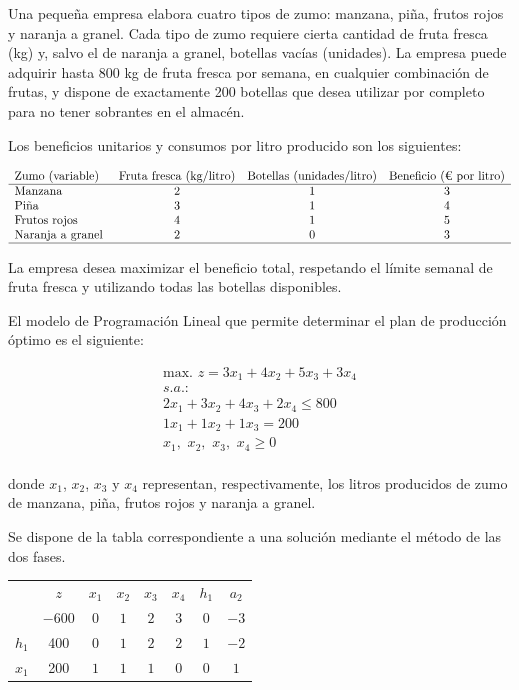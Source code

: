 Una pequeña empresa elabora cuatro tipos de zumo: manzana, piña, frutos rojos y naranja a granel.  
Cada tipo de zumo requiere cierta cantidad de fruta fresca (kg) y, salvo el de naranja a granel, botellas vacías (unidades).  
La empresa puede adquirir hasta 800 kg de fruta fresca por semana, en cualquier combinación de frutas, y dispone de exactamente 200 botellas que desea utilizar por completo para no tener sobrantes en el almacén.  

Los beneficios unitarios y consumos por litro producido son los siguientes:

\[
\begin{array}{lccc}
\text{Zumo (variable)} & \text{Fruta fresca (kg/litro)} & \text{Botellas (unidades/litro)} & \text{Beneficio (€ por litro)} \\
\hline
\text{Manzana }          & 2 & 1 & 3 \\
\text{Piña }             & 3 & 1 & 4 \\
\text{Frutos rojos }     & 4 & 1 & 5 \\
\text{Naranja a granel } & 2 & 0 & 3 \\
\hline
\end{array}
\]

La empresa desea maximizar el beneficio total, respetando el límite semanal de fruta fresca y utilizando todas las botellas disponibles.

El modelo de Programación Lineal que permite determinar el plan de producción óptimo es el siguiente:

\begin{equation}
\begin{split}
\mbox{max. } z = 3x_1 + 4x_2 + 5x_3 + 3x_4\\
s.a.:\\
2x_1 + 3x_2 + 4x_3 + 2x_4 \leq 800\\
1x_1 + 1x_2 + 1x_3 = 200\\
x_1,\,\,x_2,\,\,x_3,\,\,x_4\geq 0\\
\end{split}
\end{equation}

donde $x_1$, $x_2$, $x_3$ y $x_4$ representan, respectivamente, los litros producidos de zumo de manzana, piña, frutos rojos y naranja a granel.

Se dispone de la tabla correspondiente a una solución mediante el método de las dos fases.

\begin{center}
\begin{tabular}{c|c|cccccc|}
 & $z$ & $x_1$ & $x_2$ & $x_3$ & $x_4$ & $h_1$ & $a_2$\\ 
 & $-600$ & $0$ & $1$ & $2$ & $3$ & $0$ & $-3$ \\ 
\hline
$h_1$ & 400  & $0$ & $1$ & $2$ & $2$ & $1$ & $-2$\\ 
$x_1$ & 200  & $1$ & $1$ & $1$ & $0$ & $0$ & $1$\\ 
\hline
\end{tabular}
\end{center}




